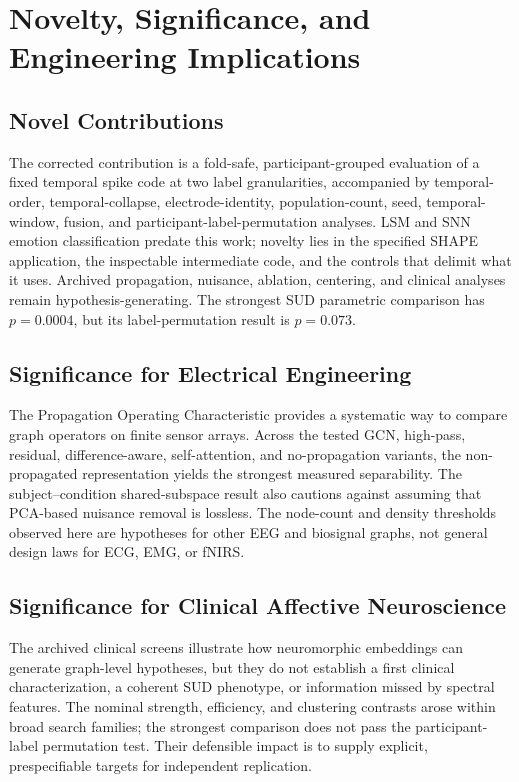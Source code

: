 \section{Novelty, Significance, and Engineering Implications}
\label{sec:ch5_novelty}

\subsection{Novel Contributions}

The corrected contribution is a fold-safe, participant-grouped evaluation of a fixed temporal spike code at two label granularities, accompanied by temporal-order, temporal-collapse, electrode-identity, population-count, seed, temporal-window, fusion, and participant-label-permutation analyses. LSM and SNN emotion classification predate this work; novelty lies in the specified SHAPE application, the inspectable intermediate code, and the controls that delimit what it uses. Archived propagation, nuisance, ablation, centering, and clinical analyses remain hypothesis-generating. The strongest SUD parametric comparison has $p=0.0004$, but its label-permutation result is $p=0.073$.

\subsection{Significance for Electrical Engineering}

The Propagation Operating Characteristic provides a systematic way to compare graph operators on finite sensor arrays. Across the tested GCN, high-pass, residual, difference-aware, self-attention, and no-propagation variants, the non-propagated representation yields the strongest measured separability. The subject--condition shared-subspace result also cautions against assuming that PCA-based nuisance removal is lossless. The node-count and density thresholds observed here are hypotheses for other EEG and biosignal graphs, not general design laws for ECG, EMG, or fNIRS.

\subsection{Significance for Clinical Affective Neuroscience}

The archived clinical screens illustrate how neuromorphic embeddings can generate graph-level hypotheses, but they do not establish a first clinical characterization, a coherent SUD phenotype, or information missed by spectral features. The nominal strength, efficiency, and clustering contrasts arose within broad search families; the strongest comparison does not pass the participant-label permutation test. Their defensible impact is to supply explicit, prespecifiable targets for independent replication.

